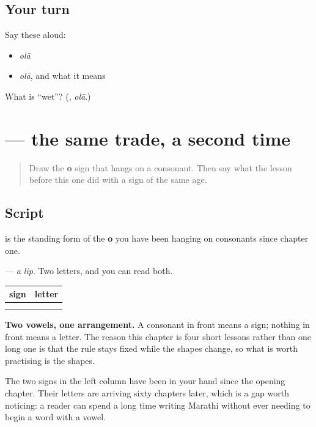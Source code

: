 \subsection*{Your turn}
Say these aloud:

\begin{itemize}
\raggedright
  \item \emph{olā}
  \item \emph{olā}, and what it means
\end{itemize}

\begin{tcolorbox}[breakable,colback=teal!4,colframe=teal!35!black,title={Before you move on}]
What is \textquotedblleft{}wet\textquotedblright{}? (\textbf{}, \emph{olā}.)
\end{tcolorbox}
\section[\texorpdfstring{\mr{ओ} (o)}{ओ (o)}]{ — the same trade, a second time}

\label{lesson:MR-W65-o-independent}



\begin{quote}
Draw the \textbf{o} sign that hangs on a consonant. Then say what the lesson before this one did with a sign of the same age.
\end{quote}

\subsection*{Script}
\begin{quote}
\end{quote}

\textbf{} is the standing form of the \textbf{o} you have been hanging on consonants since chapter one.

\textbf{} — \emph{a lip}. Two letters, and you can read both.

\begin{grammarlens}[title={Grammar Lens: the same arrangement you met a lesson ago}]
\noindent
\begin{tabularx}{\linewidth}{@{}>{\raggedright\arraybackslash}X>{\raggedright\arraybackslash}X@{}}
\toprule
\textbf{sign} & \textbf{letter} \\
\midrule
\mr{◌ी} & \mr{ई} \\
\mr{◌ो} & \mr{ओ} \\
\bottomrule
\end{tabularx}

\textbf{Two vowels, one arrangement.} A consonant in front means a sign; nothing in front means a letter. The reason this chapter is four short lessons rather than one long one is that the rule stays fixed while the shapes change, so what is worth practising is the shapes.

The two signs in the left column have been in your hand since the opening chapter. Their letters are arriving sixty chapters later, which is a gap worth noticing: a reader can spend a long time writing Marathi without ever needing to begin a word with a vowel.
\end{grammarlens}

